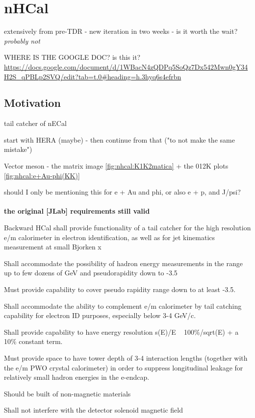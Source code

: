 \chapter{nHCal}\label{cha:nHCal} %
extensively from pre-TDR - new iteration in two weeks - is it worth the wait? \textit{probably not}

WHERE IS THE GOOGLE DOC? is this it? \url{https://docs.google.com/document/d/1WBacN4zQDPq5SoQz7Dx542Mwn0gY34H2S_qPBLp2SVQ/edit?tab=t.0#heading=h.3hyq6s4efrbn}

\section{Motivation}
tail catcher of nECal

start with HERA (maybe) - then continue from that ("to not make the same mistake")

Vector meson - the matrix image \ref{fig:nhcal:K1K2matica} + the 012K plots \ref{fig:nhcal:e+Au-phi(KK)}

should I only be mentioning this for e + Au and phi, or also e + p, and J/psi?
\\\,\\
\textbf{the original [JLab] requirements still valid}

Backward HCal shall provide functionality of a tail catcher for the high resolution e/m calorimeter in electron identification, as well as for jet kinematics measurement at small Bjorken x

Shall accommodate the possibility of hadron energy measurements in the range up to few dozens of GeV and pseudorapidity down to -3.5

Must provide capability to cover pseudo rapidity range down to at least -3.5.

Shall accommodate the ability to complement e/m calorimeter by tail catching capability for electron ID purposes, especially below 3-4 GeV/c.

Shall provide capability to have energy resolution s(E)/E ~ 100\%/sqrt(E) + a 10\% constant term.

Must provide space to have tower depth of 3-4 interaction lengths (together with the e/m PWO crystal calorimeter) in order to suppress longitudinal leakage for relatively small hadron energies in the e-endcap.

Should be built of non-magnetic materials

Shall not interfere with the detector solenoid magnetic field


